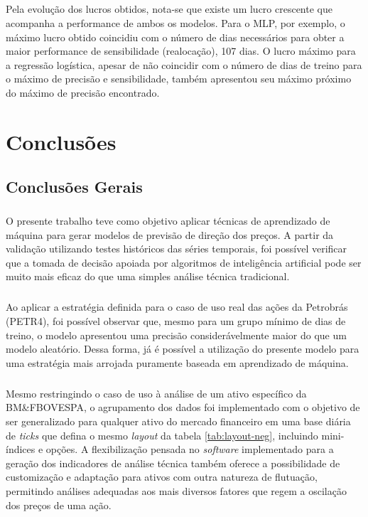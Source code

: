 \documentclass[grad,numbers]{coppe}
\begin{document}
        \paragraph{}Pela evolução dos lucros obtidos, nota-se que existe um lucro crescente que acompanha a performance de ambos os modelos. Para o MLP, por exemplo, o máximo lucro obtido coincidiu com o número de dias necessários para obter a maior performance de sensibilidade (realocação), 107 dias. O lucro máximo para a regressão logística, apesar de não coincidir com o número de dias de treino para o máximo de precisão e sensibilidade, também apresentou seu máximo próximo do máximo de precisão encontrado. 
        
  
  \chapter{Conclusões}
  
    \section{Conclusões Gerais}
    
        \paragraph{}O presente trabalho teve como objetivo aplicar técnicas de aprendizado de máquina para gerar modelos de previsão de direção dos preços. A partir da validação utilizando testes históricos das séries temporais, foi possível verificar que a tomada de decisão apoiada por algoritmos de inteligência artificial pode ser muito mais eficaz do que uma simples análise técnica tradicional.
        
        \paragraph{}Ao aplicar a estratégia definida para o caso de uso real das ações da Petrobrás (PETR4), foi possível observar que, mesmo para um grupo mínimo de dias de treino, o modelo apresentou uma precisão considerávelmente maior do que um modelo aleatório. Dessa forma, já é possível a utilização do presente modelo para uma estratégia mais arrojada puramente baseada em aprendizado de máquina.
        
        \paragraph{}Mesmo restringindo o caso de uso à análise de um ativo específico da BM\&FBOVESPA, o agrupamento dos dados foi implementado com o objetivo de ser generalizado para qualquer ativo do mercado financeiro em uma base diária de \textit{ticks} que defina o mesmo \textit{layout} da tabela \ref{tab:layout-neg}, incluindo mini-índices e opções. A flexibilização pensada no \textit{software} implementado para a geração dos indicadores de análise técnica também oferece a possibilidade de customização e adaptação para ativos com outra natureza de flutuação, permitindo análises adequadas aos mais diversos fatores que regem a oscilação dos preços de uma ação.
        
\end{document}
